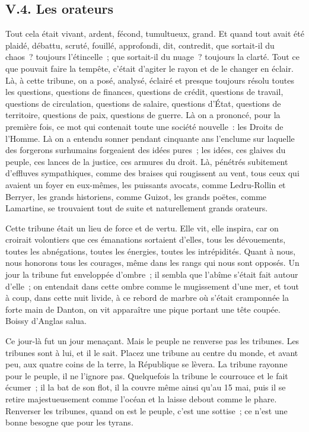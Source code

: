 \documentclass[french,twoside]{book} %
\begin{document}
\subsection[{V.4. Les orateurs}]{V.4. Les orateurs}
\noindent Tout cela était vivant, ardent, fécond, tumultueux, grand. Et quand tout avait été plaidé, débattu, scruté, fouillé, approfondi, dit, contredit, que sortait-il du chaos ? toujours l’étincelle ; que sortait-il du nuage ? toujours la clarté. Tout ce que pouvait faire la tempête, c’était d’agiter le rayon et de le changer en éclair. Là, à cette tribune, on a posé, analysé, éclairé et presque toujours résolu toutes les questions, questions de finances, questions de crédit, questions de travail, questions de circulation, questions de salaire, questions d’État, questions de territoire, questions de paix, questions de guerre. Là on a prononcé, pour la première fois, ce mot qui contenait toute une société nouvelle : les Droits de l’Homme. Là on a entendu sonner pendant cinquante ans l’enclume sur laquelle des forgerons surhumains forgeaient des idées pures ; les idées, ces glaives du peuple, ces lances de la justice, ces armures du droit. Là, pénétrés subitement d’effluves sympathiques, comme des braises qui rougissent au vent, tous ceux qui avaient un foyer en eux-mêmes, les puissants avocats, comme Ledru-Rollin et Berryer, les grands historiens, comme Guizot, les grands poëtes, comme Lamartine, se trouvaient tout de suite et naturellement grands orateurs.\par
Cette tribune était un lieu de force et de vertu. Elle vit, elle inspira, car on croirait volontiers que ces émanations sortaient d’elles, tous les dévouements, toutes les abnégations, toutes les énergies, toutes les intrépidités. Quant à nous, nous honorons tous les courages, même dans les rangs qui nous sont opposés. Un jour la tribune fut enveloppée d’ombre ; il sembla que l’abîme s’était fait autour d’elle ; on entendait dans cette ombre comme le mugissement d’une mer, et tout à coup, dans cette nuit livide, à ce rebord de marbre où s’était cramponnée la forte main de Danton, on vit apparaître une pique portant une tête coupée. Boissy d’Anglas salua.\par
Ce jour-là fut un jour menaçant. Mais le peuple ne renverse pas les tribunes. Les tribunes sont à lui, et il le sait. Placez une tribune au centre du monde, et avant peu, aux quatre coins de la terre, la République se lèvera. La tribune rayonne pour le peuple, il ne l’ignore pas. Quelquefois la tribune le courrouce et le fait écumer ; il la bat de son flot, il la couvre même ainsi qu’au 15 mai, puis il se retire majestueusement comme l’océan et la laisse debout comme le phare. Renverser les tribunes, quand on est le peuple, c’est une sottise ; ce n’est une bonne besogne que pour les tyrans.\par
\end{document}
